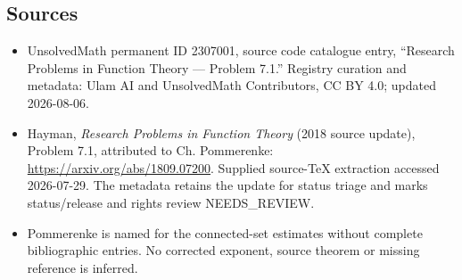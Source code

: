 \documentclass[11pt]{article}
\begin{document}
\subsection{Sources}
\begin{itemize}
\item UnsolvedMath permanent ID 2307001, source code catalogue entry, ``Research Problems in Function Theory --- Problem 7.1.'' Registry curation and metadata: Ulam AI and UnsolvedMath Contributors, CC BY 4.0; updated 2026-08-06.
\item Hayman, \emph{Research Problems in Function Theory} (2018 source update), Problem 7.1, attributed to Ch. Pommerenke: \url{https://arxiv.org/abs/1809.07200}. Supplied source-TeX extraction accessed 2026-07-29. The metadata retains the update for status triage and marks status/release and rights review NEEDS\_REVIEW.
\item Pommerenke is named for the connected-set estimates without complete bibliographic entries. No corrected exponent, source theorem or missing reference is inferred.
\end{itemize}
\end{document}
